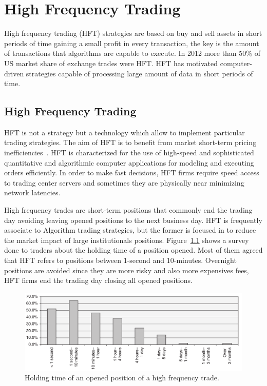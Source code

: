 \chapter{High Frequency Trading}

High frequency trading (HFT) strategies are based on buy and sell assets in
short periods of time gaining a small profit in every transaction, the key is
the amount of transactions that algorithms are capable to execute. 
In 2012 more than 50\% of US market share of exchange trades were HFT.  HFT has
motivated computer-driven strategies capable of processing large amount of data
in short periods of time. 


\section{High Frequency Trading}

HFT is not a strategy but a technology which allow to implement particular
trading strategies. The aim of HFT is to benefit from market short-term pricing
inefficiencies~\cite{chlistalla2011}. HFT is characterized for the use of
high-speed and sophisticated quantitative and algorithmic computer applications
for modeling and executing orders efficiently. In order to make fast decisions,
HFT firms require speed access to trading center servers and sometimes they are
physically near minimizing network latencies.

High frequency trades are short-term positions that commonly end the trading
day avoiding leaving opened positions to the next business day. HFT is
frequently associate to Algorithm trading strategies, but the former is focused
in to reduce the market impact of large institutionals positions.
Figure~\ref{fig:HFTtimes} shows a survey done to traders about the holding time
of a position opened. Most of them agreed that HFT refers to positions between
1-second and 10-minutes. Overnight positions are avoided since they are more
risky and also more expensives fees, HFT firms end the trading day closing all
opened positions.



\begin{figure}[!h]
  \centering
  \includegraphics[width=\textwidth]{img/HFTtradestime}
  \caption{Holding time of an opened position of a high frequency trade.}
  \label{fig:HFTtimes}
\end{figure}




